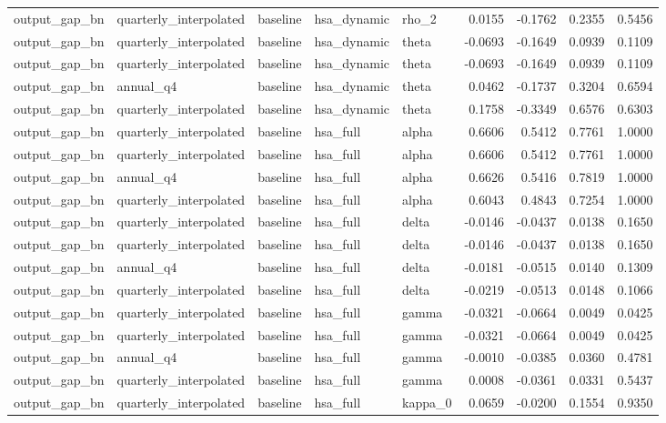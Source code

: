 \begin{tabular}{lllllrrrr}
output\_gap\_bn & quarterly\_interpolated & baseline & hsa\_dynamic & rho\_2 & 0.0155 & -0.1762 & 0.2355 & 0.5456 \\
output\_gap\_bn & quarterly\_interpolated & baseline & hsa\_dynamic & theta & -0.0693 & -0.1649 & 0.0939 & 0.1109 \\
output\_gap\_bn & quarterly\_interpolated & baseline & hsa\_dynamic & theta & -0.0693 & -0.1649 & 0.0939 & 0.1109 \\
output\_gap\_bn & annual\_q4 & baseline & hsa\_dynamic & theta & 0.0462 & -0.1737 & 0.3204 & 0.6594 \\
output\_gap\_bn & quarterly\_interpolated & baseline & hsa\_dynamic & theta & 0.1758 & -0.3349 & 0.6576 & 0.6303 \\
output\_gap\_bn & quarterly\_interpolated & baseline & hsa\_full & alpha & 0.6606 & 0.5412 & 0.7761 & 1.0000 \\
output\_gap\_bn & quarterly\_interpolated & baseline & hsa\_full & alpha & 0.6606 & 0.5412 & 0.7761 & 1.0000 \\
output\_gap\_bn & annual\_q4 & baseline & hsa\_full & alpha & 0.6626 & 0.5416 & 0.7819 & 1.0000 \\
output\_gap\_bn & quarterly\_interpolated & baseline & hsa\_full & alpha & 0.6043 & 0.4843 & 0.7254 & 1.0000 \\
output\_gap\_bn & quarterly\_interpolated & baseline & hsa\_full & delta & -0.0146 & -0.0437 & 0.0138 & 0.1650 \\
output\_gap\_bn & quarterly\_interpolated & baseline & hsa\_full & delta & -0.0146 & -0.0437 & 0.0138 & 0.1650 \\
output\_gap\_bn & annual\_q4 & baseline & hsa\_full & delta & -0.0181 & -0.0515 & 0.0140 & 0.1309 \\
output\_gap\_bn & quarterly\_interpolated & baseline & hsa\_full & delta & -0.0219 & -0.0513 & 0.0148 & 0.1066 \\
output\_gap\_bn & quarterly\_interpolated & baseline & hsa\_full & gamma & -0.0321 & -0.0664 & 0.0049 & 0.0425 \\
output\_gap\_bn & quarterly\_interpolated & baseline & hsa\_full & gamma & -0.0321 & -0.0664 & 0.0049 & 0.0425 \\
output\_gap\_bn & annual\_q4 & baseline & hsa\_full & gamma & -0.0010 & -0.0385 & 0.0360 & 0.4781 \\
output\_gap\_bn & quarterly\_interpolated & baseline & hsa\_full & gamma & 0.0008 & -0.0361 & 0.0331 & 0.5437 \\
output\_gap\_bn & quarterly\_interpolated & baseline & hsa\_full & kappa\_0 & 0.0659 & -0.0200 & 0.1554 & 0.9350 \\

\end{tabular}
